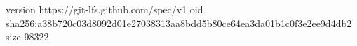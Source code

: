version https://git-lfs.github.com/spec/v1
oid sha256:a38b720c03d8092d01e27038313aa8bdd5b80ce64ea3da01b1c0f3e2ee9d4db2
size 98322
